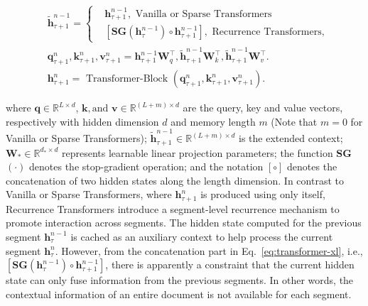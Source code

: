 \documentclass[11pt,a4paper]{article}
\begin{document}
\begin{small}
\begin{equation}
\begin{aligned}
&\widetilde{\mathbf{h}}_{\tau+1}^{n-1} = \left\{
\begin{aligned}
&\mathbf{h}_{\tau+1}^{n-1}, \text{  Vanilla or Sparse Transformers} \\
&[\mathrm{\textbf{SG}}(\mathbf{h}_{\tau}^{n-1}) \circ \mathbf{h}_{\tau+1}^{n-1}], \text{  Recurrence Transformers}, 
\end{aligned}
\right. \\
&\mathbf{q}_{\tau+1}^{n}, \mathbf{k}_{\tau+1}^{n}, \mathbf{v}_{\tau+1}^{n} =\mathbf{h}_{\tau+1}^{n-1} \mathbf{W}_{q}^{\top}, \widetilde{\mathbf{h}}_{\tau+1}^{n-1} \mathbf{W}_{k}^{\top}, \widetilde{\mathbf{h}}_{\tau+1}^{n-1} \mathbf{W}_{v}^{\top}. \\
&\mathbf{h}_{\tau+1}^{n} =\text{ Transformer-Block }(\mathbf{q}_{\tau+1}^{n}, \mathbf{k}_{\tau+1}^{n}, \mathbf{v}_{\tau+1}^{n}). 
\end{aligned}\label{eq:transformer-xl}
\end{equation}
\end{small}
where $\mathbf{q} \in \mathbb{R}^{L \times d}$, $\mathbf{k}, \text{and } \mathbf{v} \in \mathbb{R}^{(L+m) \times d}$ are the query, key and value vectors, respectively with hidden dimension $d$ and memory length $m$ (Note that $m=0$ for Vanilla or Sparse Transformers); $\widetilde{\mathbf{h}}_{\tau+1}^{n-1} \in \mathbb{R}^{(L+m) \times d}$ is the extended context; $\mathbf{W}_\ast \in \mathbb{R}^{d_\ast \times d}$ represents learnable linear projection parameters; the function \textbf{SG}$(\cdot)$ denotes the stop-gradient operation; and the notation $[\circ]$ denotes the concatenation of two hidden states along the length dimension. In contrast to Vanilla or Sparse Transformers, where $\mathbf{h}^{n}_{\tau+1}$ is produced using only itself, Recurrence Transformers introduce a segment-level recurrence mechanism to promote interaction across segments. The hidden state computed for the previous segment $\mathbf{h}^{n-1}_{\tau}$ is cached as an auxiliary context to help process the current segment $\mathbf{h}^{n}_{\tau}$. However, from the concatenation part in Eq.~\ref{eq:transformer-xl}, i.e., $[\mathrm{\textbf{SG}}(\mathbf{h}_{\tau}^{n-1}) \circ \mathbf{h}_{\tau+1}^{n-1}]$, there is apparently a constraint that the current hidden state can only fuse information from the previous segments. In other words, the contextual information of an entire document is not available for each segment.
\end{document}
